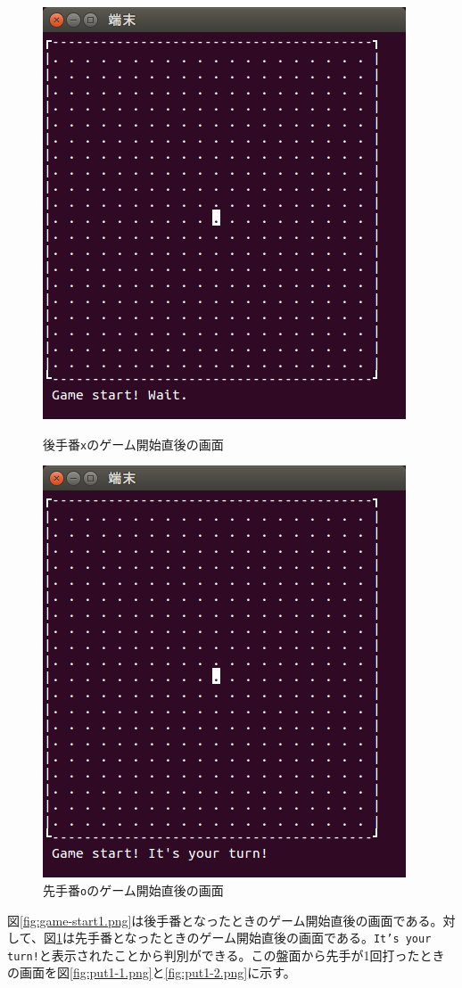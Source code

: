 \documentclass[a4j, titlepage, 10pt]{jsarticle}
\newcommand{\code}[1]{\texttt{#1}}
\begin{document}
\begin{figure}[H]
  \begin{minipage}{0.5\hsize}
    \centering
    \includegraphics[scale=0.5]{img/game-start1.png}
    \caption{後手番\code{x}のゲーム開始直後の画面}
    \label{fig:game-start1.png}
  \end{minipage}
  \begin{minipage}{0.5\hsize}
    \includegraphics[scale=0.5]{img/game-start2.png}
    \caption{先手番\code{o}のゲーム開始直後の画面}
    \label{fig:game-start2.png}
  \end{minipage}
\end{figure}
図\ref{fig:game-start1.png}は後手番となったときのゲーム開始直後の画面である。対して、図\ref{fig:game-start2.png}は先手番となったときのゲーム開始直後の画面である。\texttt{It's your turn!}と表示されたことから判別ができる。この盤面から先手が1回打ったときの画面を図\ref{fig:put1-1.png}と\ref{fig:put1-2.png}に示す。
\end{document}
